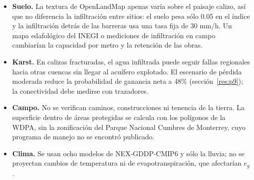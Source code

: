 \documentclass[11pt,letterpaper]{article}
\begin{document}
\begin{itemize}
  \item \textbf{Suelo.} La textura de OpenLandMap apenas varía sobre el paisaje calizo, así que no diferencia la infiltración entre sitios: el suelo pesa sólo 0.05 en el índice y la infiltración detrás de las barreras usa una tasa fija de 30 mm/h. Un mapa edafológico del INEGI o mediciones de infiltración en campo cambiarían la capacidad por metro y la retención de las obras.
  \item \textbf{Karst.} En calizas fracturadas, el agua infiltrada puede seguir fallas regionales hacia otras cuencas sin llegar al acuífero explotado. El escenario de pérdida moderada reduce la probabilidad de ganancia neta a 48\% (sección~\ref{res:p9}); la conectividad debe medirse con trazadores.
  \item \textbf{Campo.} No se verifican caminos, construcciones ni tenencia de la tierra. La superficie dentro de áreas protegidas se calcula con los polígonos de la WDPA, sin la zonificación del Parque Nacional Cumbres de Monterrey, cuyo programa de manejo no se encontró publicado.
  \item \textbf{Clima.} Se usan ocho modelos de NEX-GDDP-CMIP6 y sólo la lluvia; no se proyectan cambios de temperatura ni de evapotranspiración, que afectarían $e_g$.
\end{itemize}
\end{document}
